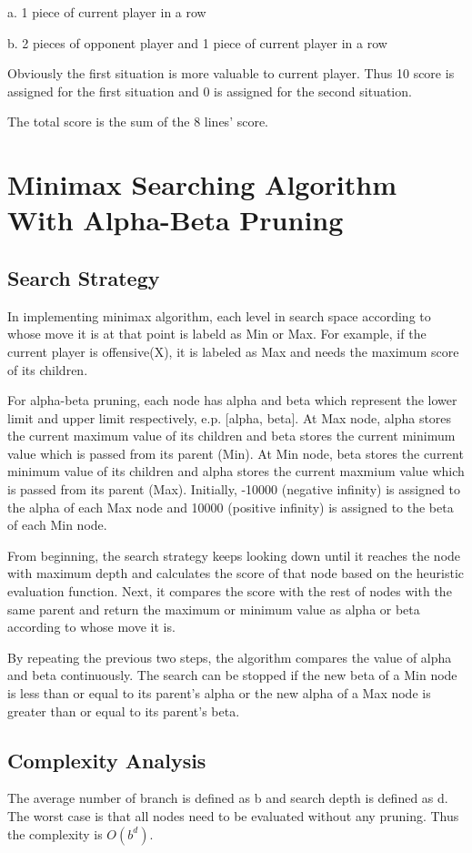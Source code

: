 \documentclass[titlepage]{article}
\begin{document}
a. 1 piece of current player in a row 

b. 2 pieces of opponent player and 1 piece of current player in a row 

Obviously the first situation is more valuable to current player. Thus 10
score is assigned for the first situation and 0 is assigned for the second
situation.

The total score is the sum of the 8 lines' score.

\section{Minimax Searching Algorithm With Alpha-Beta Pruning}
\label{sec:org0f5607b}
\subsection{Search Strategy}
\label{sec:org1779a4e}
In implementing minimax algorithm, each level in search space according to
whose move it is at that point is labeld as Min or Max. For example, if the
current player is offensive(X), it is labeled as Max and needs the maximum
score of its children.

For alpha-beta pruning, each node has alpha and beta which represent the
lower limit and upper limit respectively, e.p. [alpha, beta]. At Max node,
alpha stores the current maximum value of its children and beta stores the
current minimum value which is passed from its parent (Min). At Min node,
beta stores the current minimum value of its children and alpha stores the
current maxmium value which is passed from its parent (Max). Initially,
-10000 (negative infinity) is assigned to the alpha of each Max node and
10000 (positive infinity) is assigned to the beta of each Min node.

From beginning, the search strategy keeps looking down until it reaches the
node with maximum depth and calculates the score of that node based on the
heuristic evaluation function. Next, it compares the score with the rest of
nodes with the same parent and return the maximum or minimum value as alpha
or beta according to whose move it is.

By repeating the previous two steps, the algorithm compares the value of
alpha and beta continuously. The search can be stopped if the new beta of a
Min node is less than or equal to its parent's alpha or the new alpha of a
Max node is greater than or equal to its parent's beta.

\subsection{Complexity Analysis}
\label{sec:org64573c3}
The average number of branch is defined as b and search depth is defined as
d. The worst case is that all nodes need to be evaluated without any pruning.
Thus the complexity is \(O(b^d)\). 
\end{document}
